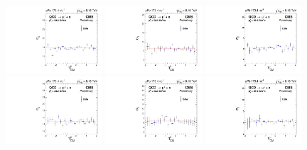 \begin{figure}[htb!]
 \centering
  \includegraphics[width=0.32\textwidth]{Figures/WBoson/Analysis/SignalExtraction/QCD_Template/EXTRAPOLATION_ETA/exGraph_ETA_Sigma0_QCDToMuMi_PA.pdf}
  \includegraphics[width=0.32\textwidth]{Figures/WBoson/Analysis/SignalExtraction/QCD_Template/EXTRAPOLATION_ETA/exGraph_ETA_Sigma1_QCDToMuMi_PA.pdf}
  \includegraphics[width=0.32\textwidth]{Figures/WBoson/Analysis/SignalExtraction/QCD_Template/EXTRAPOLATION_ETA/exGraph_ETA_Sigma2_QCDToMuMi_PA.pdf}
  \includegraphics[width=0.32\textwidth]{Figures/WBoson/Analysis/SignalExtraction/QCD_Template/EXTRAPOLATION_ETA/exGraph_ETA_Sigma0_QCDToMuPl_PA.pdf}
  \includegraphics[width=0.32\textwidth]{Figures/WBoson/Analysis/SignalExtraction/QCD_Template/EXTRAPOLATION_ETA/exGraph_ETA_Sigma1_QCDToMuPl_PA.pdf}
  \includegraphics[width=0.32\textwidth]{Figures/WBoson/Analysis/SignalExtraction/QCD_Template/EXTRAPOLATION_ETA/exGraph_ETA_Sigma2_QCDToMuPl_PA.pdf}

\end{figure}

